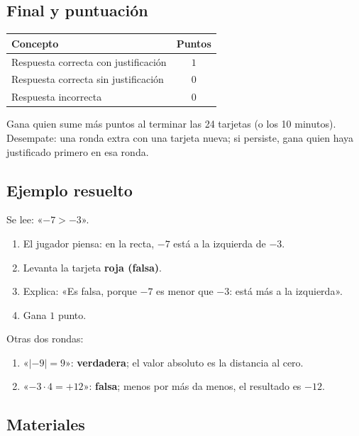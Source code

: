 \documentclass[12pt, letterpaper]{article}
\newcommand{\abs}[1]{\lvert #1\rvert}
\begin{document}
\subsection{Final y puntuación}

\begin{center}
\small
\begin{tabular}{@{}p{7.4cm} c@{}}
\toprule
\textbf{Concepto} & \textbf{Puntos}\\
\midrule
Respuesta correcta con justificación & $1$\\
Respuesta correcta sin justificación & $0$\\
Respuesta incorrecta & $0$\\
\bottomrule
\end{tabular}
\end{center}

Gana quien sume más puntos al terminar las 24 tarjetas (o los 10 minutos). Desempate: una ronda extra con una tarjeta nueva; si persiste, gana quien haya justificado primero en esa ronda.

\subsection{Ejemplo resuelto}

Se lee: «$-7>-3$».

\begin{cuadrosolucion}
\begin{enumerate}[leftmargin=*]
  \item El jugador piensa: en la recta, $-7$ está a la izquierda de $-3$.
  \item Levanta la tarjeta \textbf{roja (falsa)}.
  \item Explica: «Es falsa, porque $-7$ es menor que $-3$: está más a la izquierda».
  \item Gana $1$ punto.
\end{enumerate}
Otras dos rondas:
\begin{enumerate}[leftmargin=*]
  \item «$\abs{-9}=9$»: \textbf{verdadera}; el valor absoluto es la distancia al cero.
  \item «$-3\cdot 4=+12$»: \textbf{falsa}; menos por más da menos, el resultado es $-12$.
\end{enumerate}
\end{cuadrosolucion}

\subsection{Materiales}
\end{document}

